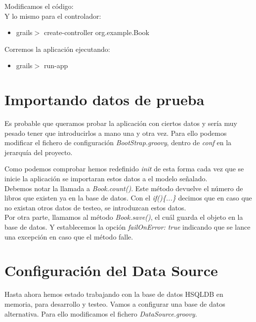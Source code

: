 \documentclass[a4paper,12pt,spanish]{article}
\begin{document}
Modificamos el código:\\



Y lo mismo para el controlador:
\begin{itemize}
\item grails$>$ create-controller org.example.Book
\end{itemize}



Corremos la aplicación ejecutando:
\begin{itemize}
\item grails$>$ run-app
\end{itemize}

\section{Importando datos de prueba}
Es probable que queramos probar la aplicación con ciertos datos y sería muy pesado tener que introducirlos a mano una y otra vez. Para ello podemos modificar el fichero de configuración {\it BootStrap.groovy}, dentro de {\it conf} en la jerarquía del proyecto.



Como podemos comprobar hemos redefinido {\it init} de esta forma cada vez que se inicie la aplicación se importaran estos datos a el modelo señalado.\\ 

Debemos notar la llamada a {\it Book.count()}. Este método devuelve el número de libros que existen ya en la base de datos. Con el {\it if()\{...\}} decimos que en caso que no existan otros datos de testeo, se introduzcan estos datos.\\

Por otra parte, llamamos al método {\it Book.save()}, el cuál guarda el objeto en la base de datos. Y establecemos la opción {\it failOnError: true} indicando que se lance una excepción en caso que el método falle.

\section{Configuración del Data Source}

Hasta ahora hemos estado trabajando con la base de datos HSQLDB en memoria, para desarrollo y testeo. Vamos a configurar una base de datos alternativa. Para ello modificamos el fichero {\it DataSource.groovy.}
\end{document}
